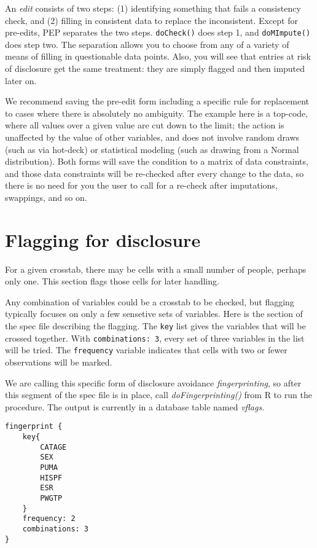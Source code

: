 \documentclass{article}
\begin{document}
An {\em edit} consists of two steps: (1) identifying something that fails a
consistency check, and (2) filling in consistent data to replace the inconsistent. Except
for pre-edits, PEP separates the two steps. {\tt doCheck()} does step
1, and {\tt doMImpute()} does step two. The separation allows you to choose from any
of a variety of means of filling in questionable data points. Also, you will see that
entries at risk of disclosure get the same treatment: they are simply flagged and then
imputed later on.

We recommend saving the pre-edit form including a specific rule for replacement to
cases where there is absolutely no ambiguity.  The example here is a top-code, where
all values over a given value are cut down to the limit; the action is unaffected by
the value of other variables, and does not involve random draws (such as via hot-deck)
or statistical modeling (such as drawing from a Normal distribution). Both forms will
save the condition to a matrix of data constraints, and those data constraints will
be re-checked after every change to the data, so there is no need for you the user to
call for a re-check after imputations, swappings, and so on.

\section{Flagging for disclosure}
For a given crosstab, there may be cells with a small number of people, perhaps
only one. This section flags those cells for later handling.

Any combination of variables could be a crosstab to be checked, but flagging
typically focuses on only a few sensetive sets of variables. Here is the section
of the spec file describing the flagging. The {\tt key} list gives the variables
that will be crossed together. With {\tt combinations: 3}, every set of three
variables in the list will be tried. The {\tt frequency} variable indicates that
cells with two or fewer observations will be marked.

We are calling this specific form of disclosure avoidance {\em fingerprinting}, so after
this segment of the spec file is in place, call {\em doFingerprinting()} from R to run the
procedure. The output is currently in a database table named {\em vflags}.

\begin{specbit} 
\begin{verbatim}
fingerprint {
	key{
		CATAGE
		SEX
		PUMA
		HISPF
		ESR
		PWGTP
	}
	frequency: 2
	combinations: 3
}
\end{verbatim}
\end{specbit} 
\end{document}
